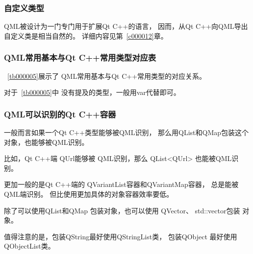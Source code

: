\subsubsection{
自定义类型
}\label{c000011s000000s01s03}

QML被设计为一门专门用于扩展Qt C{\sourcefonttwo{}+}{\sourcefonttwo{}+}的语言，
因而，从Qt C{\sourcefonttwo{}+}{\sourcefonttwo{}+}向QML导出自定义类是相当自然的。
详细内容见第\ \ref{c000012}章。

\FloatBarrier
\subsubsection{
QML常用基本与Qt C{\sourcefonttwo{}+}{\sourcefonttwo{}+}常用类型对应表
}\label{c000011s000000s01s04}


\tablename\ \ref{tb000005}展示了
QML常用基本与Qt C{\sourcefonttwo{}+}{\sourcefonttwo{}+}常用类型的对应关系。



对于\tablename\ \ref{tb000005}中
没有提及的类型，一般用var代替即可。

\FloatBarrier
\subsubsection{
QML可以识别的Qt C{\sourcefonttwo{}+}{\sourcefonttwo{}+}容器
}\label{c000011s000000s01s05}


一般而言如果一个Qt C{\sourcefonttwo{}+}{\sourcefonttwo{}+}类型能够被QML识别，
那么用QList和QMap包装这个对象，也能够被QML识别。

比如，Qt C{\sourcefonttwo{}+}{\sourcefonttwo{}+}端
QUrl能够被
QML识别，那么
QList<QUrl>
也能被QML识别。

更加一般的是Qt C{\sourcefonttwo{}+}{\sourcefonttwo{}+}端的
QVariantList容器和QVariantMap容器，
总是能被QML端识别。
但比使用更加具体的对象容器效率要低。

除了可以使用QList和QMap
包装对象，也可以使用
QVector、
std::vector包装
对象。

值得注意的是，包装QString最好使用QStringList类，
包装QObject \raisebox{-0.35ex}{\sourcefonttwo{}*} 最好使用QObjectList类。












